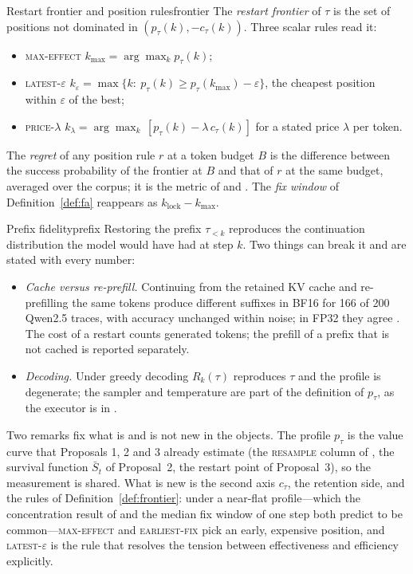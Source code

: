 \begin{definition}{Restart frontier and position rules}{frontier}
The \emph{restart frontier} of $\tau$ is the set of positions not dominated in $(p_\tau(k),-c_\tau(k))$. Three scalar rules read it:
\begin{itemize}[leftmargin=1.1em]
\item \textsc{max-effect} $k_{\max}=\arg\max_k p_\tau(k)$;
\item \textsc{latest-}$\varepsilon$ $k_\varepsilon=\max\{k:\ p_\tau(k)\ge p_\tau(k_{\max})-\varepsilon\}$, the cheapest position within $\varepsilon$ of the best;
\item \textsc{price-}$\lambda$ $k_\lambda=\arg\max_k\,[p_\tau(k)-\lambda\,c_\tau(k)]$ for a stated price $\lambda$ per token.
\end{itemize}
The \emph{regret} of any position rule $r$ at a token budget $B$ is the difference between the success probability of the frontier at $B$ and that of $r$ at the same budget, averaged over the corpus; it is the metric of  and . The \emph{fix window} of Definition~\ref{def:fa} reappears as $k_{\mathrm{lock}}-k_{\max}$.
\end{definition}

\begin{assumption}{Prefix fidelity}{prefix}
Restoring the prefix $\tau_{<k}$ reproduces the continuation distribution the model would have had at step $k$. Two things can break it and are stated with every number:
\begin{itemize}[leftmargin=1.1em]
\item \emph{Cache versus re-prefill.} Continuing from the retained KV cache and re-prefilling the same tokens produce different suffixes in BF16 for 166 of 200 Qwen2.5 traces, with accuracy unchanged within noise; in FP32 they agree \cite{lorup2026stagereplay}. The cost of a restart counts generated tokens; the prefill of a prefix that is not cached is reported separately.
\item \emph{Decoding.} Under greedy decoding $R_k(\tau)$ reproduces $\tau$ and the profile is degenerate; the sampler and temperature are part of the definition of $p_\tau$, as the executor is in \citet{liao2026repairs}.
\end{itemize}
\end{assumption}

Two remarks fix what is and is not new in the objects. The profile $p_\tau$ is the value curve that Proposals 1, 2 and 3 already estimate (the \textsc{resample} column of , the survival function $\bar S_t$ of Proposal~2, the restart point of Proposal~3), so the measurement is shared. What is new is the second axis $c_\tau$, the retention side, and the rules of Definition~\ref{def:frontier}: under a near-flat profile---which the concentration result of \citet{atri2026expanding} and the median fix window of one step both predict to be common---\textsc{max-effect} and \textsc{earliest-fix} pick an early, expensive position, and \textsc{latest-}$\varepsilon$ is the rule that resolves the tension between effectiveness and efficiency explicitly.

